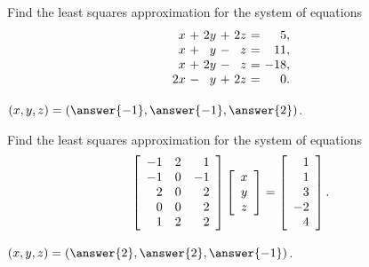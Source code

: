 \documentclass{ximera}
\author{Zack Reed}
\begin{document}
\begin{exercise}
  Find the least squares approximation for the system of equations
  \begin{equation*}
    \begin{array}{r@{~}c@{~}r@{~}c@{~}r@{~}c@{~}r}
       x &+& 2y &+& 2z &=&   5, \\
       x &+&  y &-&  z &=&  11, \\
       x &+& 2y &-&  z &=& -18, \\
      2x &-&  y &+& 2z &=&  0. \\
    \end{array}
  \end{equation*}
  \begin{solution}
    $(x,y,z) = (\answer{-1},\answer{-1},\answer{2})$.
  \end{solution}
\end{exercise}

\begin{exercise}
  Find the least squares approximation for the system of equations
  \begin{equation*}
    \startmat{rrr}
      -1 & 2 & 1 \\
      -1 & 0 & -1 \\
      2 & 0 & 2 \\
      0 & 0 & 2 \\
      1 & 2 & 2 \\
    \stopmat
    \startmat{c} x \\ y \\ z \stopmat
    =
    \startmat{r} 1 \\ 1 \\ 3 \\ -2 \\ 4 \stopmat.
  \end{equation*}
  \begin{solution}
    $(x,y,z) = (\answer{2},\answer{2},\answer{-1})$.
  \end{solution}
\end{exercise}
\end{document}
